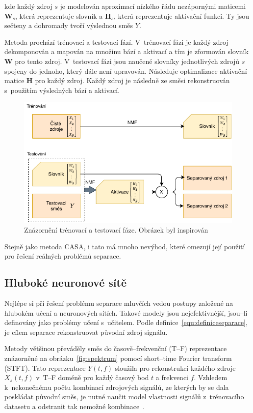kde každý zdroj $s$ je modelován aproximací nízkého řádu nezápornými maticemi $\textbf{W}_s$, která reprezentuje slovník a $\textbf{H}_s$, která reprezentuje aktivační funkci. Ty jsou sečteny a dohromady tvoří výslednou směs $Y$.

Metoda prochází trénovací a testovací fází.
V~trénovací fázi je každý zdroj dekomponován a mapován na množinu bází a aktivací a tím je zformován slovník $\textbf{W}$ pro tento zdroj.
V~testovací fázi jsou naučené slovníky jednotlivých zdrojů $s$ spojeny do jednoho, který dále není upravován. Následuje optimalizace aktivační matice $\textbf{H}$ pro každý zdroj. Každý zdroj je následně ze směsi rekonstruován s~použitím výsledných bází a aktivací.

\begin{figure}[H]
    \centering
    \includegraphics[scale=0.9]{obrazky-figures/nmf.pdf}
    \caption{\label{fig:nmf}Znázornění trénovací a testovací fáze. Obrázek byl inspirován~\cite{speechseparation}}
\end{figure}

Stejně jako metoda CASA, i tato má mnoho nevýhod, které omezují její použití pro řešení reálných problémů separace.



\subsection{Hluboké neuronové sítě}
Nejlépe si při řešení problému separace mluvčích vedou postupy založené na hlubokém učení a neuronových sítích. Takové modely jsou nejefektivnější, jsou--li definovány jako problémy učení s~učitelem. Podle definice~\ref{equ:definiceseparace}, je cílem separace rekonstruovat původní zdroj signálu.

Metody většinou převáděly směs do časově--frekvenční (T--F) reprezentace znázorněné na obrázku~\ref{fig:spektrum} pomocí short--time Fourier transform (STFT). Tato reprezentace $Y(t,f)$ sloužila pro rekonstrukci každého zdroje $X_s(t,f)$ v~T--F doméně pro každý časový bod $t$ a frekvenci $f$. Vzhledem k~nekonečnému počtu kombinací zdrojových signálů, ze kterých by se dala poskládat původní směs, je nutné naučit model vlastnosti signálů z~trénovacího datasetu a odstranit tak nemožné kombinace~\cite{speechseparation}.

